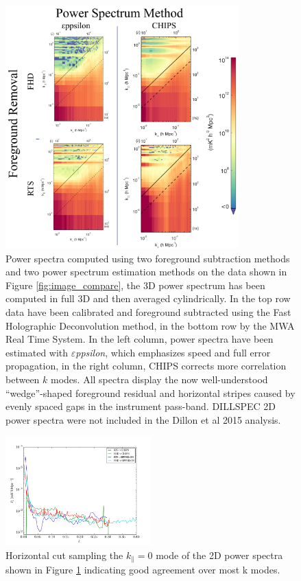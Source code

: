 \documentclass[twolcolumn,iop]{emulateapj}
\def\eppsilon{{\it $\varepsilon$ppsilon}}
\def\empirical{DILLSPEC}
\def\dilloncite{Dillon et al 2015 }
\begin{document}
\begin{figure}[h!]
\begin{center}
\includegraphics[width=0.8\textwidth]{figures/MWA_PS_compare/MWA_PS_compare.png}
\caption{Power spectra computed using two foreground subtraction methods and two power spectrum estimation methods on the data shown in Figure \ref{fig:image_compare}, the 3D power spectrum has been computed in full 3D and then averaged cylindrically.  In the top row data have been calibrated and foreground subtracted using the Fast Holographic Deconvolution method, in the bottom row by the MWA Real Time System.  In the left column, power spectra have been estimated with \eppsilon, which emphasizes speed and full error propagation, in the right column, CHIPS corrects more correlation between $k$ modes.  All spectra display the now well-understood ``wedge''-shaped foreground residual and horizontal stripes caused by evenly spaced gaps in the instrument pass-band.  \empirical{} 2D power spectra were not included in the \dilloncite{} analysis. \label{fig:pspec_compare}}
\end{center}
\end{figure}


\begin{figure}[htbp]
\begin{center}
\includegraphics[width=0.5\textwidth]{figures/MWAPipeline_compare_1d_kperp}
\caption{Horizontal cut sampling the $k_\parallel = 0$ mode of the 2D power spectra shown in Figure \ref{fig:pspec_compare} indicating good agreement over most k modes.}
\label{fig:1d_kperp}
\end{center}
\end{figure}
\end{document}
